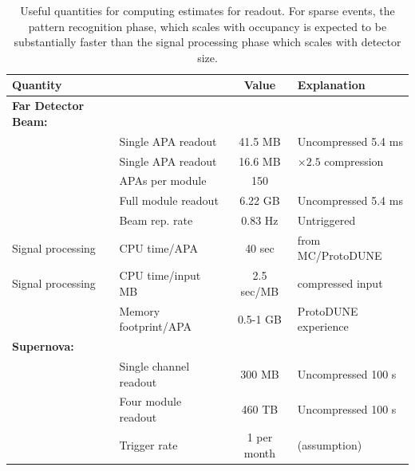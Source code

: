 \begin{table}
\begin{center}
\begin{tabular}{|l  l |c       | l |}
\hline
Quantity&&\qquad Value \qquad&Explanation\qquad \qquad \\
\hline
{\bf Far Detector Beam:}&&&\\ 
&Single APA readout &41.5 MB& Uncompressed 5.4 ms\\ 
&Single APA readout &16.6 MB& $\times 2.5$ compression\\
&APAs per module& 150&\\
&Full module readout &6.22  GB& Uncompressed 5.4 ms\\ 
&Beam rep. rate&0.83 Hz&Untriggered\\  
Signal processing &CPU time/APA&40 sec&from MC/ProtoDUNE\\  
Signal processing &CPU time/input MB& 2.5 sec/MB& compressed input\\
&Memory footprint/APA&0.5-1 GB&ProtoDUNE experience\\  
\hline
{\bf Supernova:}&&&\\
&Single channel readout &300 MB& Uncompressed 100 s\\  
&Four module readout& 460 TB& Uncompressed 100 s\\  
&Trigger rate&1  per month&(assumption)\\
\hline
\end{tabular}
\caption{Useful quantities for computing estimates for 
readout. For  sparse  events, the pattern recognition phase, which scales with occupancy is expected to be substantially faster than the signal processing phase which scales with detector size.  }%
\label{tab:exec-comp-bigpicture-es}
\end{center}
\end{table}


